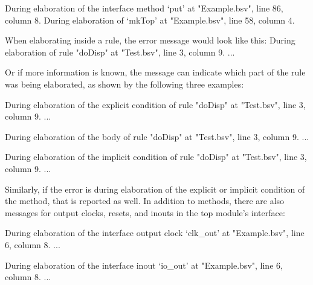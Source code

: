 \documentclass{article}
\newcommand{\te}[1]{\texttt{#1}}
\newenvironment{centerboxverbatim}
  {\center
   \boxedverbatim}
  {\endboxedverbatim
  {\endcenter }}
\begin{document}
\begin{centerboxverbatim}
During elaboration of the interface method `put' at "Example.bsv",
line 86, column 8.
During elaboration of `mkTop' at "Example.bsv", line 58, column 4.
\end{centerboxverbatim}

When elaborating inside a rule, the error message would look like this:
\begin{centerboxverbatim}
During elaboration of rule "doDisp" at "Test.bsv", line 3, column 9.
...
\end{centerboxverbatim}

Or if more information is known, the message can indicate which part
of the rule was being elaborated, as shown by the following three examples:

\begin{centerboxverbatim}
During elaboration of the explicit condition of rule "doDisp" at "Test.bsv",
  line 3, column 9.
...
\end{centerboxverbatim}

\begin{centerboxverbatim}
During elaboration of the body of rule "doDisp" at "Test.bsv", line 3,
  column 9.
...
\end{centerboxverbatim}

\begin{centerboxverbatim}
During elaboration of the implicit condition of rule "doDisp" at "Test.bsv",
  line 3, column 9.
  ...
\end{centerboxverbatim}

Similarly, if the error is during elaboration of the explicit or
implicit condition of the method, that is reported as well.  In
addition to methods, there are
also messages for output clocks, resets, and inouts in the top
module's interface:

\begin{centerboxverbatim}
During elaboration of the interface output clock `clk_out' at
"Example.bsv",
  line 6, column 8.
  ...
\end{centerboxverbatim}

\begin{centerboxverbatim}
During elaboration of the interface inout `io_out' at "Example.bsv",
  line 6, column 8.
  ...
\end{centerboxverbatim}

\end{document}
